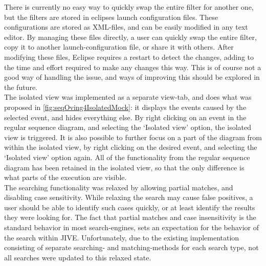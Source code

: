 There is currently no easy way to quickly swap the entire filter for another one, but the filters are stored in eclipses launch configuration files.
These configurations are stored as XML-files, and can be easily modified in any text editor.
By managing these files directly, a user can quickly swap the entire filter, copy it to another launch-configuration file, or share it with others.
After modifying these files, Eclipse requires a restart to detect the changes, adding to the time and effort required to make any changes this way.
This is of course not a good way of handling the issue, and ways of improving this should be explored in the future.
~\\

The isolated view was implemented as a separate view-tab, and does what was proposed in \autoref{fig:seqOving4IsolatedMock}: it displays the events caused by the selected event, and hides everything else.
By right clicking on an event in the regular sequence diagram, and selecting the `Isolated view' option, the isolated view is triggered.%
It is also possible to further focus on a part of the diagram from within the isolated view, by right clicking on the desired event, and selecting the `Isolated view' option again.
All of the functionality from the regular sequence diagram has been retained in the isolated view, so that the only difference is what parts of the execution are visible.
~\\
 
The searching functionality was relaxed by allowing partial matches, and disabling case sensitivity.
While relaxing the search may cause false positives, a user should be able to identify such cases quickly, or at least identify the results they were looking for.
The fact that partial matches and case insensitivity is the standard behavior in most search-engines, sets an expectation for the behavior of the search within JIVE.
Unfortunately, due to the existing implementation consisting of separate searching- and matching-methods for each search type, not all searches were updated to this relaxed state.

